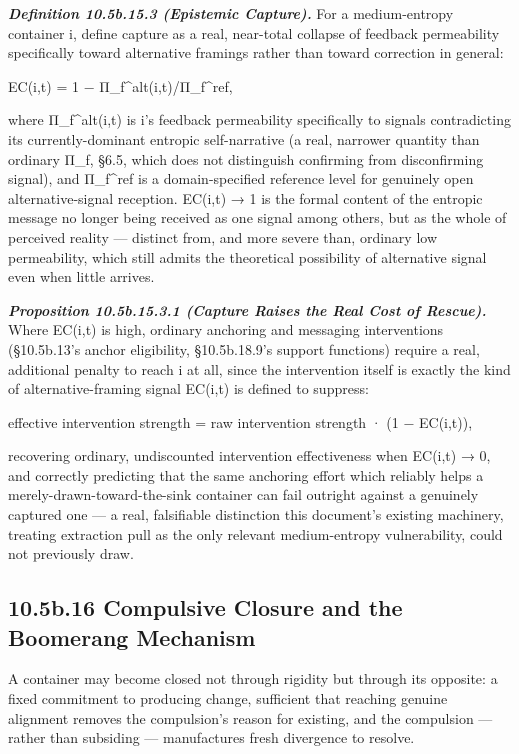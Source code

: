 \documentclass[
]{article}
\begin{document}
\emph{\textbf{Definition 10.5b.15.3 (Epistemic Capture).}} For a
medium-entropy container i, define capture as a real, near-total
collapse of feedback permeability specifically toward alternative
framings rather than toward correction in general:

EC(i,t) = 1 − Π\_f\^{}alt(i,t)/Π\_f\^{}ref,

where Π\_f\^{}alt(i,t) is i's feedback permeability specifically to
signals contradicting its currently-dominant entropic self-narrative (a
real, narrower quantity than ordinary Π\_f, §6.5, which does not
distinguish confirming from disconfirming signal), and Π\_f\^{}ref is a
domain-specified reference level for genuinely open alternative-signal
reception. EC(i,t) → 1 is the formal content of the entropic message no
longer being received as one signal among others, but as the whole of
perceived reality --- distinct from, and more severe than, ordinary low
permeability, which still admits the theoretical possibility of
alternative signal even when little arrives.

\emph{\textbf{Proposition 10.5b.15.3.1 (Capture Raises the Real Cost of
Rescue).}} Where EC(i,t) is high, ordinary anchoring and messaging
interventions (§10.5b.13's anchor eligibility, §10.5b.18.9's support
functions) require a real, additional penalty to reach i at all, since
the intervention itself is exactly the kind of alternative-framing
signal EC(i,t) is defined to suppress:

effective intervention strength = raw intervention strength · (1 −
EC(i,t)),

recovering ordinary, undiscounted intervention effectiveness when
EC(i,t) → 0, and correctly predicting that the same anchoring effort
which reliably helps a merely-drawn-toward-the-sink container can fail
outright against a genuinely captured one --- a real, falsifiable
distinction this document's existing machinery, treating extraction pull
as the only relevant medium-entropy vulnerability, could not previously
draw.

\hypertarget{b.16-compulsive-closure-and-the-boomerang-mechanism}{%
\subsection{10.5b.16 Compulsive Closure and the Boomerang
Mechanism}\label{b.16-compulsive-closure-and-the-boomerang-mechanism}}

A container may become closed not through rigidity but through its
opposite: a fixed commitment to producing change, sufficient that
reaching genuine alignment removes the compulsion's reason for existing,
and the compulsion --- rather than subsiding --- manufactures fresh
divergence to resolve.
\end{document}
